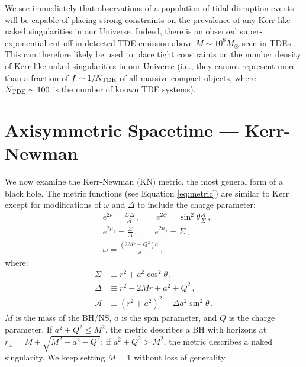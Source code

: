 \documentclass[
    reprint,
    prd,
    nofootinbib,
    amsmath,amssymb,
    aps,
    floatfix,
]{revtex4-2}
\begin{document}
We see immediately that observations of a population of tidal disruption events will be capable of placing strong constraints on the prevalence of any Kerr-like naked singularities in our Universe. Indeed, there is an observed super-exponential cut-off in detected TDE emission above $M \sim 10^8 M_\odot$ seen in TDEs \cite{Yao23, MummeryVV25}. This can therefore likely be used to place tight constraints on the number density of Kerr-like naked singularities in our Universe (i.e., they cannot represent more than a fraction of $f\sim 1/N_{\rm TDE}$ of all massive compact objects, where $N_{\rm TDE} \sim 100$ is the number of known TDE systems). 


\section{Axisymmetric Spacetime --- Kerr-Newman} \label{sec:kn}


We now examine the Kerr-Newman (KN) metric, the most general form of a black hole. The metric functions (see Equation \ref{eq:metric}) are similar to Kerr except for modifications of $\omega$ and $\Delta$ to include the charge parameter:
\begin{equation}
    \begin{split}
        &e^{2\nu} = \frac{\Sigma \Delta}{\mathcal{A}} \, , \qquad e^{2\psi} = \sin^{2}{\theta} \frac{\mathcal{A}}{\Sigma} \, , \\
        &e^{2\mu_{1}} = \frac{\Sigma}{\Delta} \, , \qquad e^{2\mu_{2}} = \Sigma \, , \\
        &\omega = \frac{(2Mr - Q^{2})a}{\mathcal{A}} \, ,
    \end{split}
\end{equation}
where:
\begin{equation}
    \begin{split}
        \Sigma &\equiv r^{2} + a^{2}\cos^{2}{\theta} \, , \\
        \Delta &\equiv r^{2} - 2Mr + a^{2} + Q^{2} \, , \\
        \mathcal{A} &\equiv (r^{2} + a^{2})^{2} - \Delta a^{2} \sin^{2}{\theta} \, .
    \end{split}
\end{equation}
$M$ is the mass of the BH/NS, $a$ is the spin parameter, and $Q$ is the charge parameter. If $a^{2} + Q^{2} \le M^{2}$, the metric describes a BH with horizons at $r_{\pm} = M \pm \sqrt{M^{2} - a^{2} - Q^{2}}$; if $a^{2} + Q^{2} > M^{2}$, the metric describes a naked singularity. We keep setting $M = 1$ without loss of generality.
\end{document}
